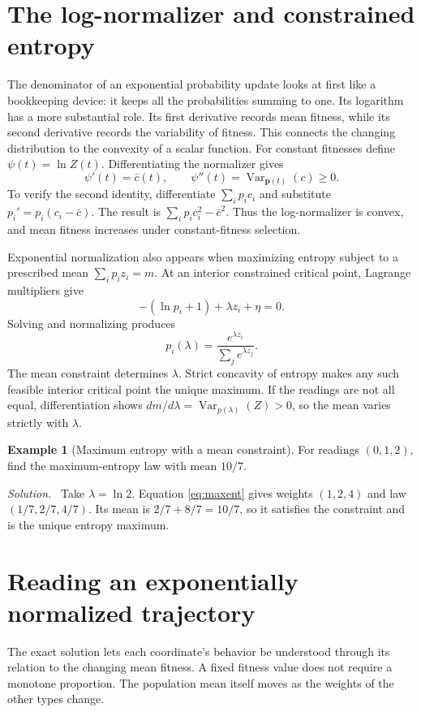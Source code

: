 \documentclass[11pt,oneside,openany]{book}
\theoremstyle{definition}
\newtheorem{example}{Example}[chapter]
\theoremstyle{remark}
\newenvironment{solution}{\par\smallskip\noindent\textit{Solution.}\ }{\par\smallskip}
\newcommand{\Var}{\operatorname{Var}}
\newcommand{\p}{\mathbf{p}}
\numberwithin{equation}{chapter}
\begin{document}
\section{The log-normalizer and constrained entropy}
The denominator of an exponential probability update looks at first like a bookkeeping device: it keeps all the probabilities summing to one. Its logarithm has a more substantial role. Its first derivative records mean fitness, while its second derivative records the variability of fitness. This connects the changing distribution to the convexity of a scalar function.
For constant fitnesses define $\psi(t)=\ln Z(t)$. Differentiating the normalizer gives
\begin{equation}\label{eq:logpartition}
\psi'(t)=\bar c(t),\qquad
\psi''(t)=\Var_{\p(t)}(c)\geq0.
\end{equation}
To verify the second identity, differentiate $\sum_i p_ic_i$ and substitute $p_i'=p_i(c_i-\bar c)$. The result is $\sum_i p_ic_i^2-\bar c^2$. Thus the log-normalizer is convex, and mean fitness increases under constant-fitness selection.

Exponential normalization also appears when maximizing entropy subject to a prescribed mean $\sum_i p_i z_i=m$. At an interior constrained critical point, Lagrange multipliers give
\[
-(\ln p_i+1)+\lambda z_i+\eta=0.
\]
Solving and normalizing produces
\begin{equation}\label{eq:maxent}
p_i(\lambda)=\frac{e^{\lambda z_i}}{\sum_je^{\lambda z_j}}.
\end{equation}
The mean constraint determines $\lambda$. Strict concavity of entropy makes any such feasible interior critical point the unique maximum. If the readings are not all equal, differentiation shows $dm/d\lambda=\Var_{p(\lambda)}(Z)>0$, so the mean varies strictly with $\lambda$.

\begin{example}[Maximum entropy with a mean constraint]
For readings $(0,1,2)$, find the maximum-entropy law with mean $10/7$.
\begin{solution}
Take $\lambda=\ln2$. Equation \eqref{eq:maxent} gives weights $(1,2,4)$ and law $(1/7,2/7,4/7)$. Its mean is $2/7+8/7=10/7$, so it satisfies the constraint and is the unique entropy maximum.
\end{solution}
\end{example}

\section{Reading an exponentially normalized trajectory}
The exact solution lets each coordinate's behavior be understood through its relation to the changing mean fitness. A fixed fitness value does not require a monotone proportion. The population mean itself moves as the weights of the other types change.
\end{document}
